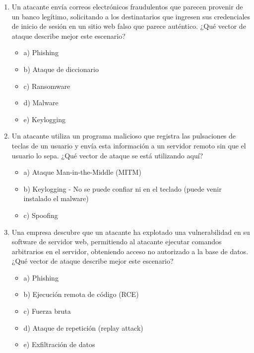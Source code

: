 \documentclass[a4paper]{article}
\begin{document}
\begin{enumerate}
    \item Un atacante envía correos electrónicos fraudulentos que parecen provenir de un banco legítimo, solicitando a los destinatarios que ingresen sus credenciales de inicio de sesión en un sitio web falso que parece auténtico.
    ¿Qué vector de ataque describe mejor este escenario?
    \begin{itemize}
        \item a) Phishing
        \item b) Ataque de diccionario
        \item c) Ransomware
        \item d) Malware
        \item e) Keylogging
    \end{itemize}
    
    \item Un atacante utiliza un programa malicioso que registra las pulsaciones de teclas de un usuario y envía esta información a un servidor remoto sin que el usuario lo sepa.
    ¿Qué vector de ataque se está utilizando aquí?
    \begin{itemize}
        \item a) Ataque Man-in-the-Middle (MITM)
        \item b) Keylogging - No se puede confiar ni en el teclado (puede venir instalado el malware)
        \item c) Spoofing
    \end{itemize}
    
    \item Una empresa descubre que un atacante ha explotado una vulnerabilidad en su software de servidor web, permitiendo al atacante ejecutar comandos arbitrarios en el servidor, obteniendo acceso no autorizado a la base de datos.
    ¿Qué vector de ataque describe mejor este escenario?
    \begin{itemize}
        \item a) Phishing
        \item b) Ejecución remota de código (RCE)
        \item c) Fuerza bruta
        \item d) Ataque de repetición (replay attack)
        \item e) Exfiltración de datos
    \end{itemize}
    

\end{enumerate}
\end{document}
